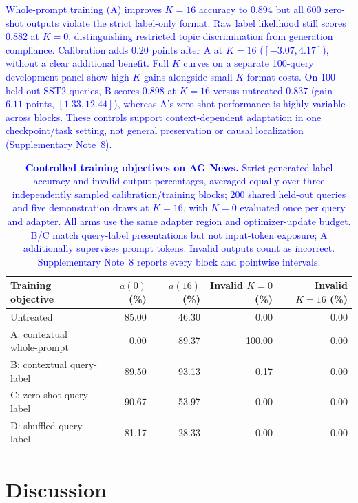 \documentclass[pdflatex, sn-nature]{sn-jnl}%
\theoremstyle{thmstyleone}%
\theoremstyle{thmstyletwo}%
\theoremstyle{thmstylethree}%
\begin{document}
\textcolor{blue}{Whole-prompt training (A) improves $K{=}16$ accuracy to $0.894$ but
all 600 zero-shot outputs violate the strict label-only format. Raw label likelihood
still scores $0.882$ at $K{=}0$, distinguishing restricted topic discrimination from
generation compliance. Calibration adds $0.20$ points after A at $K{=}16$
($[-3.07,4.17]$), without a clear additional benefit. Full $K$ curves on a separate
100-query development panel show high-$K$ gains alongside small-$K$ format costs.
On 100 held-out SST2 queries, B scores $0.898$ at $K{=}16$ versus untreated $0.837$
(gain $6.11$ points, $[1.33,12.44]$), whereas A's zero-shot performance is highly
variable across blocks. These controls support context-dependent adaptation in one
checkpoint/task setting, not general preservation or causal localization
(Supplementary Note}~\textcolor{blue}{8).}

\begin{table}[t]
\centering
\caption{\textbf{\textcolor{blue}{Controlled training objectives on AG News.}}
\textcolor{blue}{Strict generated-label accuracy and invalid-output percentages, averaged equally
over three independently sampled calibration/training blocks; 200 shared held-out
queries and five demonstration draws at $K{=}16$, with $K{=}0$ evaluated once per
query and adapter. All arms use the same adapter region and optimizer-update
budget. B/C match query-label presentations but not input-token exposure;
A additionally supervises prompt tokens. Invalid outputs count as incorrect.
Supplementary Note}~\textcolor{blue}{8 reports every block and pointwise intervals.}}
\label{tab:controlled}
\footnotesize
\begin{tabular}{lrrrr}
\toprule
Training objective & $a(0)$ (\%) & $a(16)$ (\%) & Invalid $K{=}0$ (\%) & Invalid $K{=}16$ (\%) \\
\midrule
Untreated & 85.00 & 46.30 & 0.00 & 0.00 \\
A: contextual whole-prompt & 0.00 & 89.37 & 100.00 & 0.00 \\
B: contextual query-label & 89.50 & 93.13 & 0.17 & 0.00 \\
C: zero-shot query-label & 90.67 & 53.97 & 0.00 & 0.00 \\
D: shuffled query-label & 81.17 & 28.33 & 0.00 & 0.00 \\
\bottomrule
\end{tabular}
\end{table}

\section{Discussion}\label{sec:discussion}
\end{document}
